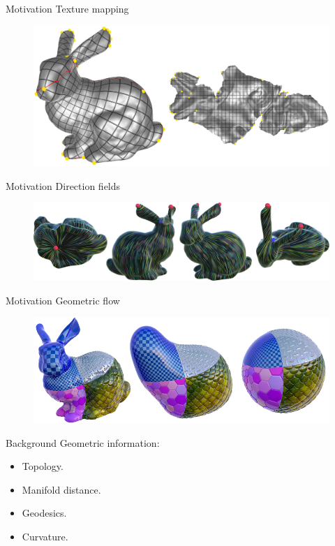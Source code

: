 \documentclass[UKenglish]{beamer}
\begin{document}
\begin{frame}{Motivation}
    Texture mapping
    \vfill
    \begin{figure}
        \centering
        \includegraphics[width=.8\textwidth]{Figures/texture_map_bunny.jpg}
    \end{figure}
\end{frame}

\begin{frame}{Motivation}
    Direction fields
    \vfill
    \begin{figure}
        \centering
        \includegraphics[width=.9\textwidth]{Figures/optimal_lines_bunny.png}
    \end{figure}
\end{frame}

\begin{frame}{Motivation}
    Geometric flow
    \vfill
    \begin{figure}
        \centering
        \includegraphics[width=.9\textwidth]{Figures/bunny_flow.png}
    \end{figure}
\end{frame}

\begin{frame}{Background}
    Geometric information:
    \begin{itemize}
        \item Topology.
        \item Manifold distance.
        \item Geodesics.
        \item Curvature.
    \end{itemize}
\end{frame}
\end{document}
